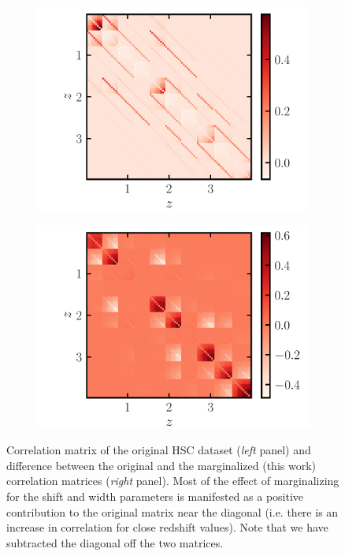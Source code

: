 \documentclass[a4paper,11pt]{article}
\begin{document}
\begin{figure}[ht]
\centering
\begin{subfigure}{.5\textwidth}
  \centering
  \includegraphics[width=1.\linewidth]{./corr_data}
\end{subfigure}%
\begin{subfigure}{.5\textwidth}
  \centering
  \includegraphics[width=1.\linewidth]{./corr_diff}
\end{subfigure}
\caption{Correlation matrix of the original HSC dataset (\textit{left} panel) and difference between the
original and the marginalized (this work)
correlation matrices (\textit{right} panel). Most of the
effect of marginalizing for the shift and width
parameters is manifested as a positive contribution
to the original matrix near the diagonal (i.e. there
is an increase in correlation for close redshift
values). Note that we have subtracted the diagonal
off the two matrices.}
\label{fig:fid_marg_cov}
\end{figure}
\end{document}
